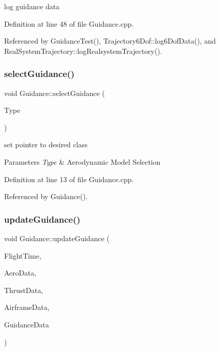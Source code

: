 log guidance data 



Definition at line 48 of file Guidance.\+cpp.



Referenced by Guidance\+Test(), Trajectory6\+Dof\+::log6\+Dof\+Data(), and Real\+System\+Trajectory\+::log\+Realsystem\+Trajectory().

\mbox{\label{class_guidance_af38a54211f890c38b8dcc99f2f2d5f32}} 
\subsubsection{\texorpdfstring{select\+Guidance()}{selectGuidance()}}
{\footnotesize\ttfamily void Guidance\+::select\+Guidance (\begin{DoxyParamCaption}\item[{int}]{Type }\end{DoxyParamCaption})}



set pointer to desired class 


\begin{DoxyParams}{Parameters}
{\em Type} & Aerodynamic Model Selection \\
\hline
\end{DoxyParams}


Definition at line 13 of file Guidance.\+cpp.



Referenced by Guidance().

\mbox{\label{class_guidance_a63f50ab91a4661b7d5d4927e6deb14ff}} 
\subsubsection{\texorpdfstring{update\+Guidance()}{updateGuidance()}}
{\footnotesize\ttfamily void Guidance\+::update\+Guidance (\begin{DoxyParamCaption}\item[{\hyperlink{group___tools_ga3f1431cb9f76da10f59246d1d743dc2c}{Float64}}]{Flight\+Time,  }\item[{Aerodynamic\+Struct \&}]{Aero\+Data,  }\item[{Thrust\+Struct \&}]{Thrust\+Data,  }\item[{Airframe\+Struct \&}]{Airframe\+Data,  }\item[{Guidance\+Struct \&}]{Guidance\+Data }\end{DoxyParamCaption})}



